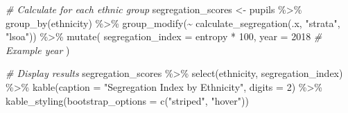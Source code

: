 \documentclass[
]{article}
\newenvironment{Shaded}{\begin{snugshade}}{\end{snugshade}}
\newcommand{\AttributeTok}[1]{\textcolor[rgb]{0.77,0.63,0.00}{#1}}
\newcommand{\CommentTok}[1]{\textcolor[rgb]{0.56,0.35,0.01}{\textit{#1}}}
\newcommand{\DecValTok}[1]{\textcolor[rgb]{0.00,0.00,0.81}{#1}}
\newcommand{\FunctionTok}[1]{\textcolor[rgb]{0.00,0.00,0.00}{#1}}
\newcommand{\NormalTok}[1]{#1}
\newcommand{\OtherTok}[1]{\textcolor[rgb]{0.56,0.35,0.01}{#1}}
\newcommand{\SpecialCharTok}[1]{\textcolor[rgb]{0.00,0.00,0.00}{#1}}
\newcommand{\StringTok}[1]{\textcolor[rgb]{0.31,0.60,0.02}{#1}}
\begin{document}
\begin{Shaded}
\begin{Highlighting}[]
\CommentTok{\# Calculate for each ethnic group}
\NormalTok{segregation\_scores }\OtherTok{\textless{}{-}}\NormalTok{ pupils }\SpecialCharTok{\%\textgreater{}\%}
  \FunctionTok{group\_by}\NormalTok{(ethnicity) }\SpecialCharTok{\%\textgreater{}\%}
  \FunctionTok{group\_modify}\NormalTok{(}\SpecialCharTok{\textasciitilde{}} \FunctionTok{calculate\_segregation}\NormalTok{(.x, }\StringTok{"strata"}\NormalTok{, }\StringTok{"lsoa"}\NormalTok{)) }\SpecialCharTok{\%\textgreater{}\%}
  \FunctionTok{mutate}\NormalTok{(}
    \AttributeTok{segregation\_index =}\NormalTok{ entropy }\SpecialCharTok{*} \DecValTok{100}\NormalTok{,}
    \AttributeTok{year =} \DecValTok{2018}  \CommentTok{\# Example year}
\NormalTok{  )}

\CommentTok{\# Display results}
\NormalTok{segregation\_scores }\SpecialCharTok{\%\textgreater{}\%}
  \FunctionTok{select}\NormalTok{(ethnicity, segregation\_index) }\SpecialCharTok{\%\textgreater{}\%}
  \FunctionTok{kable}\NormalTok{(}\AttributeTok{caption =} \StringTok{"Segregation Index by Ethnicity"}\NormalTok{, }\AttributeTok{digits =} \DecValTok{2}\NormalTok{) }\SpecialCharTok{\%\textgreater{}\%}
  \FunctionTok{kable\_styling}\NormalTok{(}\AttributeTok{bootstrap\_options =} \FunctionTok{c}\NormalTok{(}\StringTok{"striped"}\NormalTok{, }\StringTok{"hover"}\NormalTok{))}
\end{Highlighting}
\end{Shaded}
\end{document}
